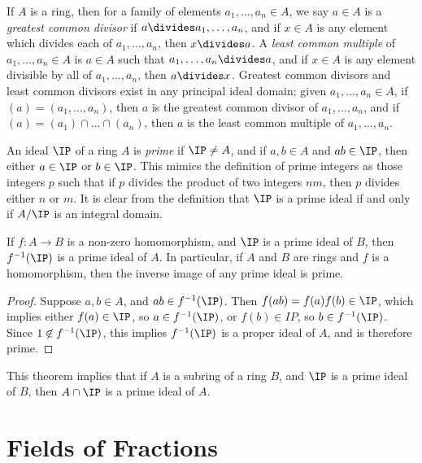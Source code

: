 \begin{example}
    If $A$ is a ring, then for a family of elements $a_1, \dots, a_n \in A$, we say $a \in A$ is a \emph{greatest common divisor} if $a \divides a_1, \dots, a_n$, and if $x \in A$ is any element which divides each of $a_1, \dots, a_n$, then $x \divides a$. A \emph{least common multiple} of $a_1, \dots, a_n \in A$ is $a \in A$ such that $a_1, \dots, a_n \divides a$, and if $x \in A$ is any element divisible by all of $a_1, \dots, a_n$, then $a \divides x$. Greatest common divisors and least common divisors exist in any principal ideal domain; given $a_1, \dots, a_n \in A$, if $(a) = (a_1, \dots, a_n)$, then $a$ is the greatest common divisor of $a_1, \dots, a_n$, and if $(a) = (a_1) \cap \dots \cap (a_n)$, then $a$ is the least common multiple of $a_1, \dots, a_n$.
\end{example}

An ideal $\IP$ of a ring $A$ is \emph{prime} if $\IP \neq A$, and if $a,b \in A$ and $ab \in \IP$, then either $a \in \IP$ or $b \in \IP$. This mimics the definition of prime integers as those integers $p$ such that if $p$ divides the product of two integers $nm$, then $p$ divides either $n$ or $m$. It is clear from the definition that $\IP$ is a prime ideal if and only if $A/\IP$ is an integral domain.

\begin{theorem}
    If $f: A \to B$ is a non-zero homomorphism, and $\IP$ is a prime ideal of $B$, then $f^{-1}(\IP)$ is a prime ideal of $A$. In particular, if $A$ and $B$ are rings and $f$ is a homomorphism, then the inverse image of any prime ideal is prime.
\end{theorem}
\begin{proof}
    Suppose $a,b \in A$, and $ab \in f^{-1}(\IP)$. Then $f(ab) = f(a)f(b) \in \IP$, which implies either $f(a) \in \IP$, so $a \in f^{-1}(\IP)$, or $f(b) \in IP$, so $b \in f^{-1}(\IP)$. Since $1 \not \in f^{-1}(\IP)$, this implies $f^{-1}(\IP)$ is a proper ideal of $A$, and is therefore prime.
\end{proof}

\begin{remark}
    This theorem implies that if $A$ is a subring of a ring $B$, and $\IP$ is a prime ideal of $B$, then $A \cap \IP$ is a prime ideal of $A$.
\end{remark}

\section{Fields of Fractions}

